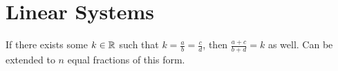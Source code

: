 \section{Linear Systems}

\begin{definition}
    If there exists some $k\in \mathbb{R}$ such that $k=\frac{a}{b}=\frac{c}{d}$, then $\frac{a+c}{b+d}=k$ as well.
    Can be extended to $n$ equal fractions of this form.
\end{definition}